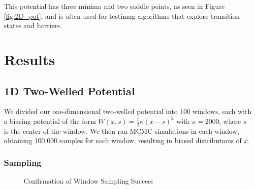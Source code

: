 \documentclass{article}
\begin{document}
This potential has three minima and two saddle points, as seen in Figure \ref{fig:2D_pot}, and is often used for testinmg algorithms that explore transition states and barriers. 

\section{Results}

\subsection{1D Two-Welled Potential}

We divided our one-dimensional two-welled potential into 100 windows, each with a biasing potential of the form $W(x, s) = \frac{1}{2} \kappa (x - s)^2$ with $\kappa = 2000$, where $s$ is the center of the window. We then ran MCMC simulations in each window, obtaining 100,000 samples for each window, resulting in biased distributions of $x$.


\subsubsection{Sampling}

\begin{figure}%
    \centering
    \qquad
    \caption{Confirmation of Window Sampling Success}%
    \label{fig:converge_diag}%
\end{figure}
\end{document}
